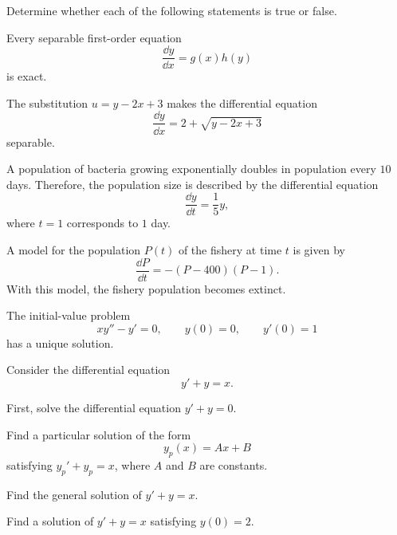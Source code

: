 \begin{problem}
Determine whether each of the following statements is true or false.
\begin{problemchoices}
\item Every separable first-order equation
\[
\frac{\dd y}{\dd x}=g(x)h(y)
\]
is exact.
\item The substitution $u=y-2x+3$ makes the differential equation
\[
\frac{\dd y}{\dd x}=2+\sqrt{y-2x+3}
\]
separable.
\item A population of bacteria growing exponentially doubles in population every $10$ days. Therefore, the population size is described by the differential equation
\[
\frac{\dd y}{\dd t}=\frac15y,
\]
where $t=1$ corresponds to $1$ day.
\item A model for the population $P(t)$ of the fishery at time $t$ is given by
\[
\frac{\dd P}{\dd t}=-(P-400)(P-1).
\]
With this model, the fishery population becomes extinct.
\item The initial-value problem
\[
xy''-y'=0,
\qquad
y(0)=0,
\qquad
y'(0)=1
\]
has a unique solution.
\end{problemchoices}
\end{problem}

\begin{problem}
Consider the differential equation
\[
y'+y=x.
\]
\begin{problemsubparts}
\item First, solve the differential equation $y'+y=0$.
\item Find a particular solution of the form
\[
y_p(x)=Ax+B
\]
satisfying $y_p'+y_p=x$, where $A$ and $B$ are constants.
\item Find the general solution of $y'+y=x$.
\item Find a solution of $y'+y=x$ satisfying $y(0)=2$.
\end{problemsubparts}
\end{problem}

